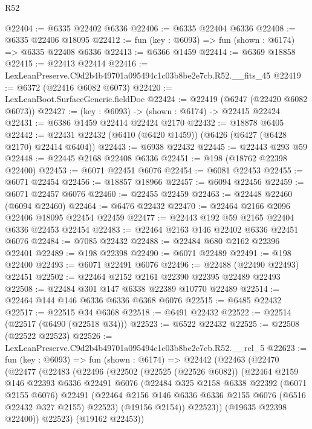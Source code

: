 \begin{lexlean}{R52}
\begin{coremodule}
@22404 := @6335 @22402 @6336
@22406 := @6335 @22404 @6336
@22408 := @6335 @22406 @18095
@22412 := fun (key : @6093) => fun (shown : @6174) => @6335 @22408 @6336
@22413 := @6366 @1459
@22414 := @6369 @18858
@22415 := @22413 @22414
@22416 := LexLeanPreserve.C9d2b4b49701a095494c1c03b8be2e7cb.R52.__fits_45
@22419 := @6372 (@22416 @6082 @6073)
@22420 := LexLeanBoot.SurfaceGeneric.fieldDoc
@22424 := @22419 (@6247 (@22420 @6082 @6073))
@22427 := (key : @6093) -> (shown : @6174) -> @22415 @22424
@22431 := @6386 @1459 @22414 @22424 @2170
@22432 := @18878 @6405
@22442 := @22431 @22432 (@6410 (@6420 @1459)) (@6426 (@6427 (@6428 @2170) @22414 @6404))
@22443 := @6938 @22432
@22445 := @22443 @293 @59
@22448 := @22445 @2168 @22408 @6336
@22451 := @198 (@18762 @22398 @22400)
@22453 := @6071 @22451 @6076
@22454 := @6081 @22453
@22455 := @6071 @22454
@22456 := @18857 @18966
@22457 := @6094 @22456
@22459 := @6071 @22457 @6076
@22460 := @22455 @22459
@22463 := @22448 @22460 (@6094 @22460)
@22464 := @6476 @22432
@22470 := @22464 @2166 @2096 @22406 @18095 @22454 @22459
@22477 := @22443 @192 @59 @2165 @22404 @6336 @22453 @22454
@22483 := @22464 @2163 @146 @22402 @6336 @22451 @6076
@22484 := @7085 @22432
@22488 := @22484 @680 @2162 @22396 @22401
@22489 := @198 @22398
@22490 := @6071 @22489
@22491 := @198 @22400
@22493 := @6071 @22491 @6076
@22496 := @22488 (@22490 @22493) @22451
@22502 := @22464 @2152 @2161 @22390 @22395 @22489 @22493
@22508 := @22484 @301 @147 @6338 @22389 @10770 @22489
@22514 := @22464 @144 @146 @6336 @6336 @6368 @6076
@22515 := @6485 @22432
@22517 := @22515 @34 @6368
@22518 := @6491 @22432
@22522 := @22514 (@22517 (@6490 (@22518 @34)))
@22523 := @6522 @22432
@22525 := @22508 (@22522 @22523)
@22526 := LexLeanPreserve.C9d2b4b49701a095494c1c03b8be2e7cb.R52.__rel_5
@22623 := fun (key : @6093) =>
  fun (shown : @6174) =>
  @22442
    (@22463
      (@22470
        (@22477
          (@22483
            (@22496
              (@22502
                (@22525 (@22526 @6082))
                (@22464
                  @2159
                  @146
                  @22393
                  @6336
                  @22491
                  @6076
                  (@22484
                    @325
                    @2158
                    @6338
                    @22392
                    (@6071 @2155 @6076)
                    @22491
                    (@22464 @2156 @146 @6336 @6336 @2155 @6076 (@6516 @22432 @327 @2155) @22523)
                    (@19156 @2154))
                  @22523))
              (@19635 @22398 @22400))
            @22523)
          (@19162 @22453))

\end{coremodule}
\end{lexlean}
